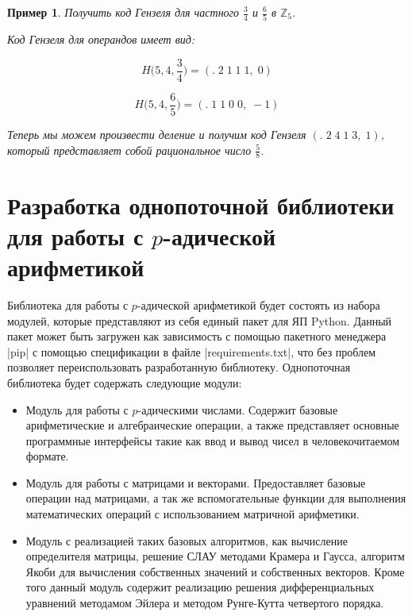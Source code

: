 \documentclass[master, och, diploma, times]{sty/SCWorks}
\theoremstyle{plain}
\newtheorem{exmp}{Пример}[section]
\theoremstyle{definition}
\numberwithin{equation}{section}
\begin{document}
\begin{exmp}
Получить код Гензеля для частного $\frac{3}{4}$ и $\frac{6}{5}$ в $\mathbb{Z}_5$.

\noindent Код Гензеля для операндов имеет вид:

$$H\bigg(5,4, \frac{3}{4}\bigg)=(.\; 2\; 1\; 1\; 1,\; 0)$$

$$H\bigg(5,4, \frac{6}{5}\bigg)=(.\; 1\; 1\; 0\; 0,\; -1)$$

\noindent Теперь мы можем произвести деление и получим код Гензеля $(.\; 2\; 4\; 1\; 3,\; 1)$, который представляет собой рациональное число $\frac{5}{8}$.
\end{exmp}

\section{Разработка однопоточной библиотеки для работы с $p$-адической арифметикой}

Библиотека для работы с $p$-адической арифметикой будет состоять из набора модулей, которые представляют из себя единый пакет для ЯП Python. Данный пакет может быть загружен как зависимость с помощью пакетного менеджера |pip| с помощью спецификации в файле |requirements.txt|, что без проблем позволяет переиспользовать разработанную библиотеку. Однопоточная библиотека будет содержать следующие модули:

\begin{itemize}
\item Модуль для работы с $p$-адическими числами. Содержит базовые арифметические и алгебраические операции, а также представляет основные программные интерфейсы такие как ввод и вывод чисел в человекочитаемом формате.
\item Модуль для работы с матрицами и векторами. Предоставляет базовые операции над матрицами, а так же вспомогательные функции для выполнения математических операций с использованием матричной арифметики.
\item Модуль с реализацией таких базовых алгоритмов, как вычисление определителя матрицы, решение СЛАУ методами Крамера и Гаусса, алгоритм Якоби для вычисления собственных значений и собственных векторов. Кроме того данный модуль содержит реализацию решения дифференциальных уравнений методамом Эйлера и методом Рунге-Кутта четвертого порядка.
\end{itemize}
\end{document}
